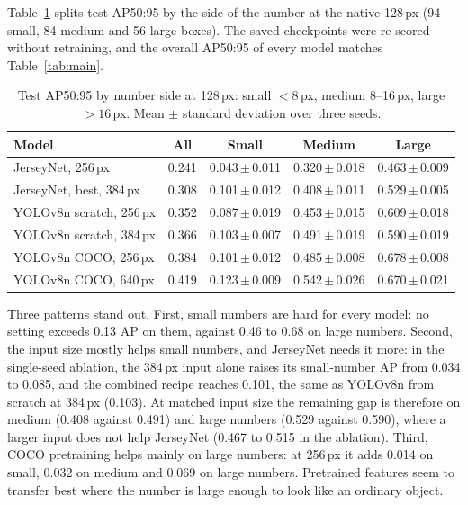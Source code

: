 \documentclass[10pt,a4paper]{article}
\newcommand{\pmv}[2]{#1\,$\pm$\,#2}
\begin{document}
Table~\ref{tab:size} splits test AP50:95 by the side of the number at the native 128\,px
(94 small, 84 medium and 56 large boxes). The saved checkpoints were re-scored without
retraining, and the overall AP50:95 of every model matches Table~\ref{tab:main}.

\begin{table}[t]
\centering\small
\caption{Test AP50:95 by number side at 128\,px: small $<8$\,px, medium 8--16\,px, large
$>16$\,px. Mean $\pm$ standard deviation over three seeds.}
\label{tab:size}
\setlength{\tabcolsep}{3.5pt}
\begin{tabular}{lcccc}
\toprule
Model & All & Small & Medium & Large \\
\midrule
JerseyNet, 256\,px        & 0.241 & \pmv{0.043}{0.011} & \pmv{0.320}{0.018} & \pmv{0.463}{0.009} \\
JerseyNet, best, 384\,px  & 0.308 & \pmv{0.101}{0.012} & \pmv{0.408}{0.011} & \pmv{0.529}{0.005} \\
YOLOv8n scratch, 256\,px  & 0.352 & \pmv{0.087}{0.019} & \pmv{0.453}{0.015} & \pmv{0.609}{0.018} \\
YOLOv8n scratch, 384\,px  & 0.366 & \pmv{0.103}{0.007} & \pmv{0.491}{0.019} & \pmv{0.590}{0.019} \\
YOLOv8n COCO, 256\,px     & 0.384 & \pmv{0.101}{0.012} & \pmv{0.485}{0.008} & \pmv{0.678}{0.008} \\
YOLOv8n COCO, 640\,px     & 0.419 & \pmv{0.123}{0.009} & \pmv{0.542}{0.026} & \pmv{0.670}{0.021} \\
\bottomrule
\end{tabular}
\end{table}

Three patterns stand out. First, small numbers are hard for every model: no setting exceeds
0.13 AP on them, against 0.46 to 0.68 on large numbers. Second, the input size mostly helps
small numbers, and JerseyNet needs it more: in the single-seed ablation, the 384\,px input
alone raises its small-number AP from 0.034 to 0.085, and the combined recipe reaches
0.101, the same as YOLOv8n from scratch at 384\,px (0.103). At matched input size the
remaining gap is therefore on medium (0.408 against 0.491) and large numbers (0.529 against
0.590), where a larger input does not help JerseyNet (0.467 to 0.515 in the ablation).
Third, COCO pretraining helps mainly on large numbers: at 256\,px it adds 0.014 on small,
0.032 on medium and 0.069 on large numbers. Pretrained features seem to transfer best where
the number is large enough to look like an ordinary object.
\end{document}
